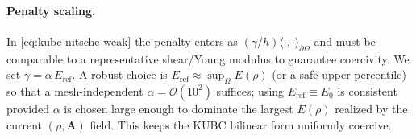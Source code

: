 \paragraph{Penalty scaling.}
In \eqref{eq:kubc-nitsche-weak} the penalty enters as $(\gamma/h)\langle\cdot,\cdot\rangle_{\partial\Omega}$ and must be comparable to a representative shear/Young modulus to guarantee coercivity. We set $\gamma=\alpha\,E_{\mathrm{ref}}$. A robust choice is $E_{\mathrm{ref}}\approx \sup_{\Omega}E(\rho)$ (or a safe upper percentile) so that a mesh-independent $\alpha=\mathcal{O}(10^2)$ suffices; using $E_{\mathrm{ref}}\equiv E_0$ is consistent provided $\alpha$ is chosen large enough to dominate the largest $E(\rho)$ realized by the current $(\rho,\mathbf{A})$ field. This keeps the KUBC bilinear form uniformly coercive.